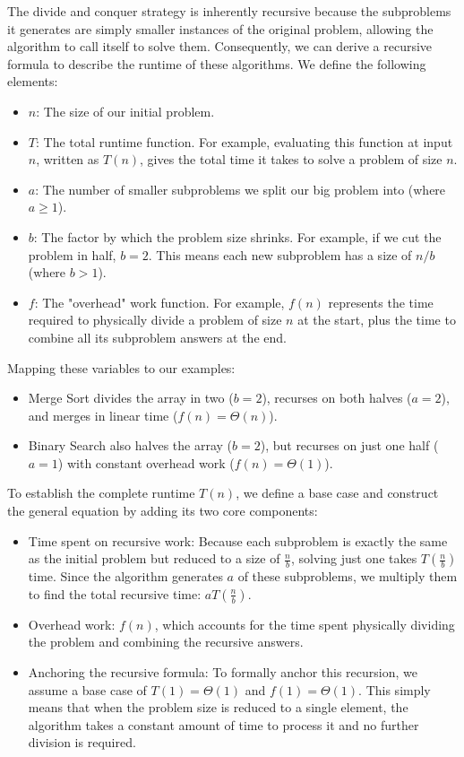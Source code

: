 \documentclass[11pt, a4paper]{article}
\begin{document}
The divide and conquer strategy is inherently recursive because the subproblems it generates are simply smaller instances of the original problem, allowing the algorithm to call itself to solve them. Consequently, we can derive a recursive formula to describe the runtime of these algorithms. We define the following elements:
\begin{itemize}
    \item $n$: The size of our initial problem.
    \item $T$: The total runtime function. For example, evaluating this function at input $n$, written as $T(n)$, gives the total time it takes to solve a problem of size $n$.
    \item $a$: The number of smaller subproblems we split our big problem into (where $a \ge 1$).
    \item $b$: The factor by which the problem size shrinks. For example, if we cut the problem in half, $b = 2$. This means each new subproblem has a size of $n/b$ (where $b > 1$).
    \item $f$: The "overhead" work function. For example, $f(n)$ represents the time required to physically divide a problem of size $n$ at the start, plus the time to combine all its subproblem answers at the end.
\end{itemize}

Mapping these variables to our examples:
\begin{itemize}
    \item Merge Sort divides the array in two ($b=2$), recurses on both halves ($a=2$), and merges in linear time ($f(n) = \Theta(n)$).

    \item  Binary Search also halves the array ($b=2$), but recurses on just one half ($a=1$) with constant overhead work ($f(n) = \Theta(1)$).
\end{itemize}


To establish the complete runtime $T(n)$, we define a base case and construct the general equation by adding its two core components:

\begin{itemize}
    \item Time spent on recursive work: Because each subproblem is exactly the same as the initial problem but reduced to a size of $\frac{n}{b}$, solving just one takes $T\left(\frac{n}{b}\right)$ time. Since the algorithm generates $a$ of these subproblems, we multiply them to find the total recursive time: $aT\left(\frac{n}{b}\right)$.

    \item Overhead work: $f(n)$, which accounts for the time spent physically dividing the problem and combining the recursive answers. 

    \item Anchoring the recursive formula: To formally anchor this recursion, we assume a base case of $T(1) = \Theta(1)$ and $f(1) = \Theta(1)$. This simply means that when the problem size is reduced to a single element, the algorithm takes a constant amount of time to process it and no further division is required.
\end{itemize}
\end{document}
